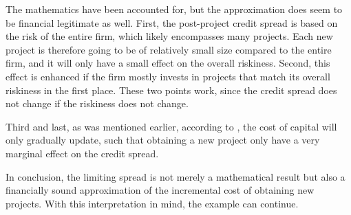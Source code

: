\documentclass[main.tex]{subfiles}
\begin{document}
        The mathematics have been accounted for, 
        but the approximation does seem to be financial legitimate as well.
        First, the post-project credit spread is based on the risk of the entire firm,
        which likely encompasses many projects.
        Each new project is therefore going to be of relatively small size compared
        to the entire firm, and it will only have a small effect on the overall riskiness.
        Second, this effect is enhanced if the firm mostly invests in projects that match
        its overall riskiness in the first place.
        These two points work, 
        since the credit spread does not change if the riskiness does not change. 

        Third and last, as was mentioned earlier, according to \textcite{Castagna2012FVA},
        the cost of capital will only gradually update, 
        such that obtaining a new project only have a very marginal effect on the credit spread.

        In conclusion, the limiting spread is not merely a mathematical result
        but also a financially sound approximation of the incremental cost of obtaining new projects.
        With this interpretation in mind, the example can continue.
\end{document}
